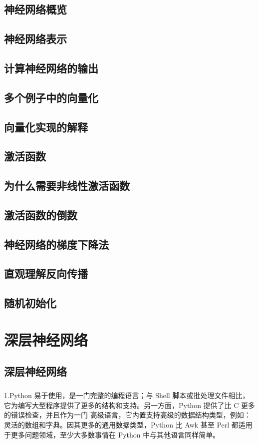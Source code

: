 \documentclass{article}
\begin{document}
\begin{CJK}{UTF8}{gbsn}
\subsection{神经网络概览}
\subsection{神经网络表示}
\subsection{计算神经网络的输出}
\subsection{多个例子中的向量化}
\subsection{向量化实现的解释}
\subsection{激活函数}
\subsection{为什么需要非线性激活函数}
\subsection{激活函数的倒数}
\subsection{神经网络的梯度下降法}
\subsection{直观理解反向传播}
\subsection{随机初始化}

\section{深层神经网络}
\subsection{深层神经网络}
\subparagraph{}
1.Python 易于使用，是一门完整的编程语言；与 Shell 脚本或批处理文件相比，它为编写大型程序提供了更多的结构和支持。另一方面，Python 提供了比 C 更多的错误检查，并且作为一门 高级语言，它内置支持高级的数据结构类型，例如：灵活的数组和字典。因其更多的通用数据类型，Python 比 Awk 甚至 Perl 都适用于更多问题领域，至少大多数事情在 Python 中与其他语言同样简单。

\end{CJK}
\end{document}
